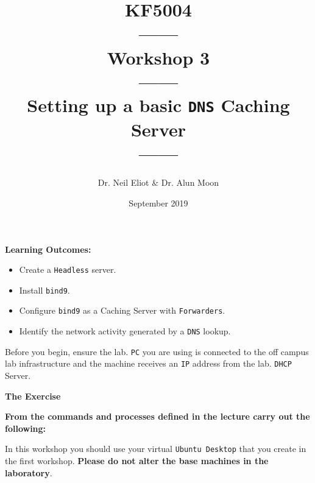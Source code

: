 \documentclass[11pt]{article}
\begin{document}
\author{Dr. Neil Eliot \& Dr. Alun Moon}
\title{KF5004\\------\\Workshop 3\\------\\Setting up a basic \texttt{DNS} Caching Server\\------}
\date{September 2019}
\maketitle

\newpage



\noindent\textbf{Learning Outcomes:}
\begin{itemize}
    \item Create a \texttt{Headless} server.
    \item Install \texttt{bind9}.
    \item Configure \texttt{bind9} as a Caching Server with \texttt{Forwarders}.
    \item Identify the network activity generated by a \texttt{DNS} lookup.
\end{itemize}


\begin{tcolorbox}[title={\textbf{Important:}}]
    Before you begin, ensure the lab. \texttt{PC} you are using is connected to the off campus lab infrastructure and the machine receives an \texttt{IP} address from the lab. \texttt{DHCP} Server.
\end{tcolorbox}
\newpage

\noindent\textbf{The Exercise}\\
\begin{tcolorbox}[colback=blue!20]
    \noindent\textbf{From the commands and processes defined in the lecture carry out the following:}
\end{tcolorbox}


\begin{tcolorbox}[title={\textbf{NOTE:}}]
    In this workshop you should use your virtual \texttt{Ubuntu Desktop} that you create in the first workshop. \textbf{Please do not alter the base machines in the laboratory}.
\end{tcolorbox}
\end{document}
